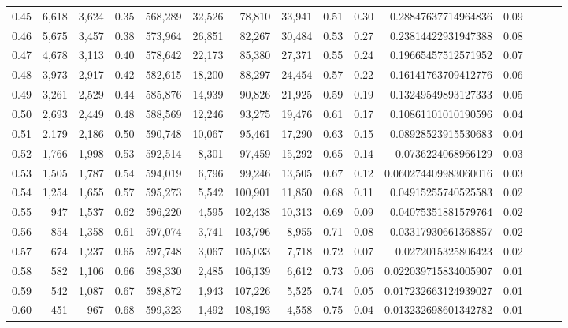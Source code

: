 \begin{tabular}{rrrrrrrrrrrrrrr}
0.45 &   6,618 &  3,624 &  0.35 &  568,289 &   32,526 &   78,810 &   33,941 &  0.51 &  0.30 &     0.28847637714964836 &      0.09 \\
0.46 &   5,675 &  3,457 &  0.38 &  573,964 &   26,851 &   82,267 &   30,484 &  0.53 &  0.27 &     0.23814422931947388 &      0.08 \\
0.47 &   4,678 &  3,113 &  0.40 &  578,642 &   22,173 &   85,380 &   27,371 &  0.55 &  0.24 &     0.19665457512571952 &      0.07 \\
0.48 &   3,973 &  2,917 &  0.42 &  582,615 &   18,200 &   88,297 &   24,454 &  0.57 &  0.22 &     0.16141763709412776 &      0.06 \\
0.49 &   3,261 &  2,529 &  0.44 &  585,876 &   14,939 &   90,826 &   21,925 &  0.59 &  0.19 &     0.13249549893127333 &      0.05 \\
0.50 &   2,693 &  2,449 &  0.48 &  588,569 &   12,246 &   93,275 &   19,476 &  0.61 &  0.17 &     0.10861101010190596 &      0.04 \\
0.51 &   2,179 &  2,186 &  0.50 &  590,748 &   10,067 &   95,461 &   17,290 &  0.63 &  0.15 &     0.08928523915530683 &      0.04 \\
0.52 &   1,766 &  1,998 &  0.53 &  592,514 &    8,301 &   97,459 &   15,292 &  0.65 &  0.14 &      0.0736224068966129 &      0.03 \\
0.53 &   1,505 &  1,787 &  0.54 &  594,019 &    6,796 &   99,246 &   13,505 &  0.67 &  0.12 &    0.060274409983060016 &      0.03 \\
0.54 &   1,254 &  1,655 &  0.57 &  595,273 &    5,542 &  100,901 &   11,850 &  0.68 &  0.11 &     0.04915255740525583 &      0.02 \\
0.55 &     947 &  1,537 &  0.62 &  596,220 &    4,595 &  102,438 &   10,313 &  0.69 &  0.09 &     0.04075351881579764 &      0.02 \\
0.56 &     854 &  1,358 &  0.61 &  597,074 &    3,741 &  103,796 &    8,955 &  0.71 &  0.08 &     0.03317930661368857 &      0.02 \\
0.57 &     674 &  1,237 &  0.65 &  597,748 &    3,067 &  105,033 &    7,718 &  0.72 &  0.07 &      0.0272015325806423 &      0.02 \\
0.58 &     582 &  1,106 &  0.66 &  598,330 &    2,485 &  106,139 &    6,612 &  0.73 &  0.06 &    0.022039715834005907 &      0.01 \\
0.59 &     542 &  1,087 &  0.67 &  598,872 &    1,943 &  107,226 &    5,525 &  0.74 &  0.05 &    0.017232663124939027 &      0.01 \\
0.60 &     451 &    967 &  0.68 &  599,323 &    1,492 &  108,193 &    4,558 &  0.75 &  0.04 &    0.013232698601342782 &      0.01 \\

\end{tabular}
